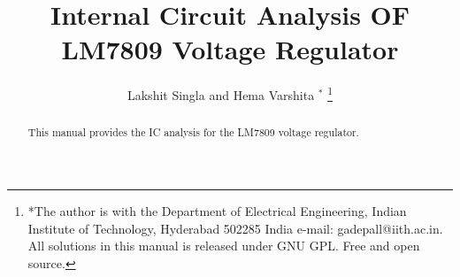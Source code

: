 \documentclass[journal,12pt,twocolumn]{IEEEtran}
\renewcommand\thesection{\arabic{section}}
\begin{document}
\makeatletter
{}
\makeatother
\let\StandardTheFigure\thefigure
\renewcommand{\thefigure}{\thesection}
\makeatletter
{}
\makeatother
\let\StandardTheFigure\thefigure
\let\StandardTheTable\thetable
\let\vec\mathbf
\def\putbox#1#2#3{\makebox[0in][l]{\makebox[#1][l]{}\raisebox{\baselineskip}[0in][0in]{\raisebox{#2}[0in][0in]{#3}}}}
     \def\rightbox#1{\makebox[0in][r]{#1}}
     \def\centbox#1{\makebox[0in]{#1}}
     \def\topbox#1{\raisebox{-\baselineskip}[0in][0in]{#1}}
     \def\midbox#1{\raisebox{-0.5\baselineskip}[0in][0in]{#1}}
\vspace{3cm}
\title{ 
Internal Circuit Analysis OF LM7809 Voltage Regulator
}
\author{ Lakshit Singla and Hema Varshita $^{*}$%
	\thanks{*The author is with the Department
		of Electrical Engineering, Indian Institute of Technology, Hyderabad
		502285 India e-mail:  gadepall@iith.ac.in. All solutions in this manual is released under GNU 
GPL.  Free and open source.}
	
}
\maketitle
\tableofcontents
\bigskip
\renewcommand{\thefigure}{\theenumi}
\renewcommand{\thetable}{\theenumi}
\begin{abstract}
This manual provides the IC analysis for the LM7809 voltage regulator. 
\end{abstract}
\end{document}
